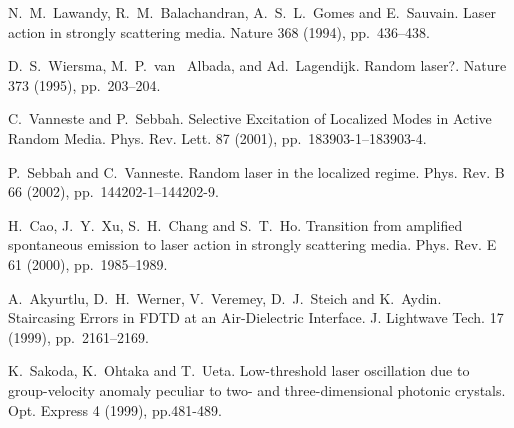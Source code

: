 
\begin{thebibliography}{10}
{\sc N.~M.~Lawandy, R.~M.~Balachandran, A.~S.~L.~Gomes and E.~Sauvain}. {Laser action in strongly scattering media}. Nature 368 (1994), pp.~436--438.

{\sc D.~S.~Wiersma, M.~P.~van ~Albada, and Ad.~Lagendijk}. {Random laser?}. Nature 373 (1995), pp.~203--204.

{\sc  C.~Vanneste and P.~Sebbah}. {Selective Excitation of Localized Modes in Active  Random Media}. Phys. Rev. Lett. 87 (2001), pp.~183903-1--183903-4.

{\sc P.~Sebbah and C.~Vanneste}. {Random laser in the localized regime}. Phys. Rev. B 66 (2002), pp.~144202-1--144202-9.

{\sc  H.~Cao, J.~Y.~Xu, S.~H.~Chang and S.~T.~Ho}. {Transition from amplified spontaneous emission to laser action in strongly scattering media}. Phys. Rev. E 61 (2000), pp.~1985--1989.

{\sc A.~Akyurtlu, D.~H.~Werner, V.~Veremey, D.~J.~Steich and K.~Aydin}. {Staircasing Errors in FDTD at an Air-Dielectric Interface}. J. Lightwave Tech. 17 (1999), pp.~2161--2169.

{\sc K.~Sakoda, K.~Ohtaka and T.~Ueta}. {Low-threshold laser oscillation due to group-velocity anomaly peculiar to two- and three-dimensional photonic crystals}. Opt. Express 4 (1999), pp.481-489.
\end{thebibliography}